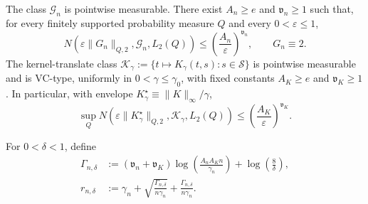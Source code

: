 \documentclass[10pt]{article}
\begin{document}
\begin{assumption}
\label{ass:encoder-complexity}
The class \(\mathcal G_n\) is pointwise measurable.  There exist
\(A_n\ge e\) and \(\mathfrak v_n\ge1\) such that, for every finitely supported
probability measure \(Q\) and every \(0<\varepsilon\le1\),
\begin{equation}
  N\!\left(
    \varepsilon\lVert G_n\rVert_{Q,2},
    \mathcal G_n,L_2(Q)
  \right)
  \le \left(\frac{A_n}{\varepsilon}\right)^{\mathfrak v_n},
  \qquad G_n\equiv2.
  \label{eq:encoder-vc-entropy}
\end{equation}
The kernel-translate class
\(\mathcal K_\gamma:=\{t\mapsto K_\gamma(t,s):s\in\mathcal S\}\)
is pointwise measurable and is VC-type, uniformly in
\(0<\gamma\le\gamma_0\), with fixed constants \(A_K\ge e\) and
\(\mathfrak v_K\ge1\).  In particular, with envelope
\(K_\gamma^\star\equiv\lVert K\rVert_\infty/\gamma\),
\begin{equation}
  \sup_Q N\!\left(
    \varepsilon\lVert K_\gamma^\star\rVert_{Q,2},
    \mathcal K_\gamma,L_2(Q)
  \right)
  \le\left(\frac{A_K}{\varepsilon}\right)^{\mathfrak v_K}.
  \label{eq:kernel-vc-entropy}
\end{equation}
\end{assumption}

For \(0<\delta<1\), define
\begin{align}
  \Gamma_{n,\delta}
  &:=(\mathfrak v_n+\mathfrak v_K)
     \log\!\left(\frac{A_nA_Kn}{\gamma_n}\right)
     +\log\!\left(\frac{8}{\delta}\right),
  \label{eq:complexity-sequence}\\
  r_{n,\delta}
  &:=
       \gamma_n
       +\sqrt{\frac{\Gamma_{n,\delta}}{n\gamma_n}}
       +\frac{\Gamma_{n,\delta}}{n\gamma_n}
     .
  \label{eq:uniform-supipm-rate}
\end{align}
\end{document}
